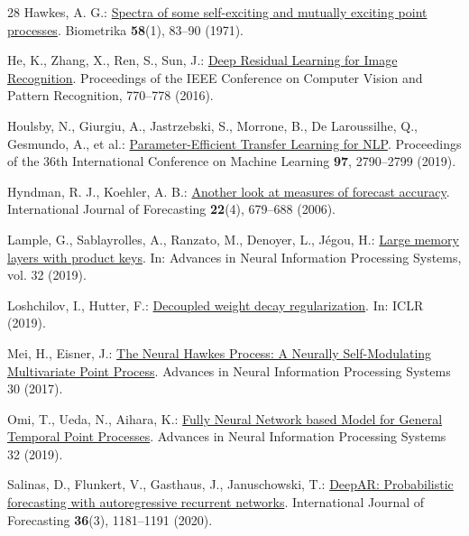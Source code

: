 \documentclass[runningheads]{llncs}
\begin{document}
\begin{thebibliography}{28}
Hawkes, A. G.: \href{https://academic.oup.com/biomet/article-abstract/58/1/83/224809}{Spectra of some self-exciting and mutually exciting point processes}. Biometrika \textbf{58}(1), 83--90 (1971). 

He, K., Zhang, X., Ren, S., Sun, J.: \href{https://openaccess.thecvf.com/content_cvpr_2016/html/He_Deep_Residual_Learning_CVPR_2016_paper.html}{Deep Residual Learning for Image Recognition}. Proceedings of the IEEE Conference on Computer Vision and Pattern Recognition, 770--778 (2016). 

Houlsby, N., Giurgiu, A., Jastrzebski, S., Morrone, B., De Laroussilhe, Q., Gesmundo, A., et al.: \href{https://proceedings.mlr.press/v97/houlsby19a.html}{Parameter-Efficient Transfer Learning for NLP}. Proceedings of the 36th International Conference on Machine Learning \textbf{97}, 2790--2799 (2019).

Hyndman, R. J., Koehler, A. B.: \href{https://doi.org/10.1016/j.ijforecast.2006.03.001}{Another look at measures of forecast accuracy}. International Journal of Forecasting \textbf{22}(4), 679--688 (2006). 

Lample, G., Sablayrolles, A., Ranzato, M., Denoyer, L., J\'egou, H.:
\href{https://papers.neurips.cc/paper/9061-large-memory-layers-with-product-keys}{Large memory layers with product keys}. In: Advances in Neural Information Processing Systems, vol. 32 (2019).

Loshchilov, I., Hutter, F.:
\href{https://arxiv.org/abs/1711.05101}{Decoupled weight decay regularization}. In: ICLR (2019).

Mei, H., Eisner, J.: \href{https://papers.nips.cc/paper_files/paper/2017/hash/6463c88460bd63bbe256e495c63aa40b-Abstract.html}{The Neural Hawkes Process: A Neurally Self-Modulating Multivariate Point Process}. Advances in Neural Information Processing Systems 30 (2017).

Omi, T., Ueda, N., Aihara, K.: \href{https://proceedings.neurips.cc/paper/2019/hash/39e4973ba3321b80f37d9b55f63ed8b8-Abstract.html}{Fully Neural Network based Model for General Temporal Point Processes}. Advances in Neural Information Processing Systems 32 (2019).

Salinas, D., Flunkert, V., Gasthaus, J., Januschowski, T.: \href{https://www.sciencedirect.com/science/article/pii/S0169207019301888}{DeepAR: Probabilistic forecasting with autoregressive recurrent networks}. International Journal of Forecasting \textbf{36}(3), 1181--1191 (2020). 


\end{thebibliography}
\end{document}

